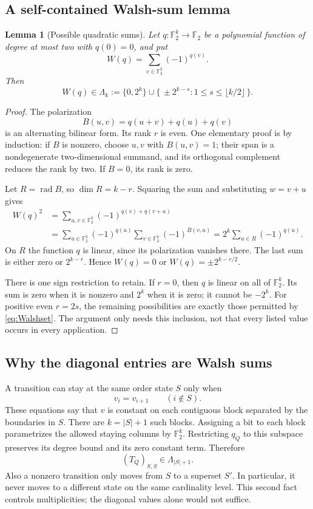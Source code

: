 \documentclass[11pt,letterpaper]{article}
\newtheorem{lemma}[theorem]{Lemma}
\theoremstyle{definition}
\newcommand{\F}{\mathbb F_2}
\newcommand{\rad}{\operatorname{rad}}
\newcommand{\1}{\mathbf 1}
\begin{document}
\subsection{A self-contained Walsh-sum lemma}
\begin{lemma}[Possible quadratic sums]\label{lem:walsh}
Let $q:\F^k\to\F$ be a polynomial function of degree at most two with $q(0)=0$,
and put
\[
 W(q)=\sum_{v\in\F^k}(-1)^{q(v)}.
\]
Then
\begin{equation}\label{eq:Walshset}
 W(q)\in\Lambda_k:=\{0,2^k\}\cup
 \{\,\pm2^{k-s}:1\le s\le\lfloor k/2\rfloor\,\}.
\end{equation}
\end{lemma}
\begin{proof}
The polarization
\[
 B(u,v)=q(u+v)+q(u)+q(v)
\]
is an alternating bilinear form. Its rank $r$ is even. One elementary proof is
by induction: if $B$ is nonzero, choose $u,v$ with $B(u,v)=1$; their span is a
nondegenerate two-dimensional summand, and its orthogonal complement reduces
the rank by two. If $B=0$, its rank is zero.

Let $R=\rad B$, so $\dim R=k-r$. Squaring the sum and substituting $w=v+u$
gives
\begin{align*}
 W(q)^2
 &=\sum_{u,v\in\F^k}(-1)^{q(v)+q(v+u)}\\
 &=\sum_{u\in\F^k}(-1)^{q(u)}
       \sum_{v\in\F^k}(-1)^{B(v,u)}
 =2^k\sum_{u\in R}(-1)^{q(u)}.
\end{align*}
On $R$ the function $q$ is linear, since its polarization vanishes there.
The last sum is either zero or $2^{k-r}$. Hence $W(q)=0$ or
$W(q)=\pm2^{k-r/2}$.

There is one sign restriction to retain. If $r=0$, then $q$ is linear on all
of $\F^k$. Its sum is zero when it is nonzero and $2^k$ when it is zero; it
cannot be $-2^k$. For positive even $r=2s$, the remaining possibilities are
exactly those permitted by \eqref{eq:Walshset}. The argument only needs this
inclusion, not that every listed value occurs in every application.
\end{proof}

\subsection{Why the diagonal entries are Walsh sums}
A transition can stay at the same order state $S$ only when
\[
 v_i=v_{i+1}\qquad(i\notin S).
\]
These equations say that $v$ is constant on each contiguous block separated by
the boundaries in $S$. There are $k=|S|+1$ such blocks. Assigning a bit to each
block parametrizes the allowed staying columns by $\F^k$. Restricting $q_Q$ to
this subspace preserves its degree bound and its zero constant term. Therefore
\begin{equation}\label{eq:diagonal}
 (T_Q)_{S,S}\in\Lambda_{|S|+1}.
\end{equation}
Also a nonzero transition only moves from $S$ to a superset $S'$. In particular,
it never moves to a different state on the same cardinality level. This second
fact controls multiplicities; the diagonal values alone would not suffice.
\end{document}
